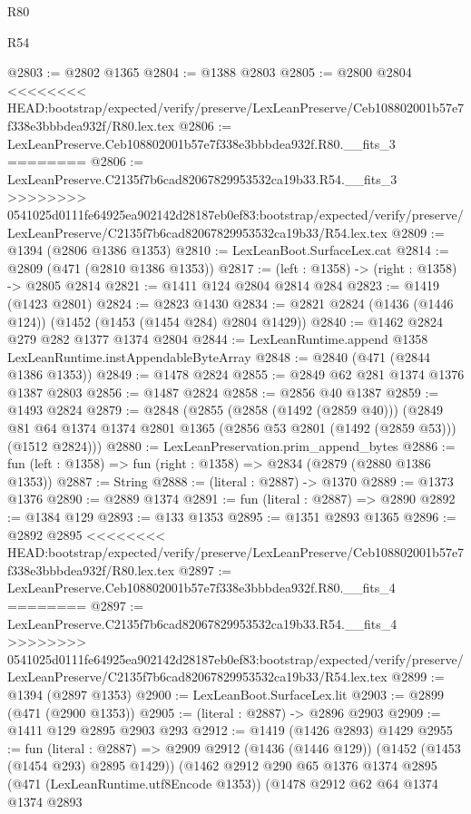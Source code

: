 \begin{lexlean}{R80}
\begin{lexlean}{R54}
\begin{coremodule}
{{{{{{{{{{{{{{{{{{{{{{{{{{{{{{{{{{{{{{{{{{{{{{{{{{@2803 := @2802 @1365
@2804 := @1388 @2803
@2805 := @2800 @2804
<<<<<<<< HEAD:bootstrap/expected/verify/preserve/LexLeanPreserve/Ceb108802001b57e7f338e3bbbdea932f/R80.lex.tex
@2806 := LexLeanPreserve.Ceb108802001b57e7f338e3bbbdea932f.R80.__fits_3
========
@2806 := LexLeanPreserve.C2135f7b6cad82067829953532ca19b33.R54.__fits_3
>>>>>>>> 0541025d0111fe64925ea902142d28187eb0ef83:bootstrap/expected/verify/preserve/LexLeanPreserve/C2135f7b6cad82067829953532ca19b33/R54.lex.tex
@2809 := @1394 (@2806 @1386 @1353)
@2810 := LexLeanBoot.SurfaceLex.cat
@2814 := @2809 (@471 (@2810 @1386 @1353))
@2817 := (left : @1358) -> (right : @1358) -> @2805 @2814
@2821 := @1411 @124 @2804 @2814 @284
@2823 := @1419 (@1423 @2801)
@2824 := @2823 @1430
@2834 := @2821 @2824 (@1436 (@1446 @124)) (@1452 (@1453 (@1454 @284) @2804 @1429))
@2840 := @1462 @2824 @279 @282 @1377 @1374 @2804
@2844 := LexLeanRuntime.append @1358 LexLeanRuntime.instAppendableByteArray
@2848 := @2840 (@471 (@2844 @1386 @1353))
@2849 := @1478 @2824
@2855 := @2849 @62 @281 @1374 @1376 @1387 @2803
@2856 := @1487 @2824
@2858 := @2856 @40 @1387
@2859 := @1493 @2824
@2879 := @2848
    (@2855
      (@2858 (@1492 (@2859 @40)))
      (@2849 @81 @64 @1374 @1374 @2801 @1365 (@2856 @53 @2801 (@1492 (@2859 @53))) (@1512 @2824)))
@2880 := LexLeanPreservation.prim_append_bytes
@2886 := fun (left : @1358) => fun (right : @1358) => @2834 (@2879 (@2880 @1386 @1353))
@2887 := String
@2888 := (literal : @2887) -> @1370
@2889 := @1373 @1376
@2890 := @2889 @1374
@2891 := fun (literal : @2887) => @2890
@2892 := @1384 @129
@2893 := @133 @1353
@2895 := @1351 @2893 @1365
@2896 := @2892 @2895
<<<<<<<< HEAD:bootstrap/expected/verify/preserve/LexLeanPreserve/Ceb108802001b57e7f338e3bbbdea932f/R80.lex.tex
@2897 := LexLeanPreserve.Ceb108802001b57e7f338e3bbbdea932f.R80.__fits_4
========
@2897 := LexLeanPreserve.C2135f7b6cad82067829953532ca19b33.R54.__fits_4
>>>>>>>> 0541025d0111fe64925ea902142d28187eb0ef83:bootstrap/expected/verify/preserve/LexLeanPreserve/C2135f7b6cad82067829953532ca19b33/R54.lex.tex
@2899 := @1394 (@2897 @1353)
@2900 := LexLeanBoot.SurfaceLex.lit
@2903 := @2899 (@471 (@2900 @1353))
@2905 := (literal : @2887) -> @2896 @2903
@2909 := @1411 @129 @2895 @2903 @293
@2912 := @1419 (@1426 @2893) @1429
@2955 := fun (literal : @2887) =>
  @2909
    @2912
    (@1436 (@1446 @129))
    (@1452 (@1453 (@1454 @293) @2895 @1429))
    (@1462
      @2912
      @290
      @65
      @1376
      @1374
      @2895
      (@471 (LexLeanRuntime.utf8Encode @1353))
      (@1478
        @2912
        @62
        @64
        @1374
        @1374
        @2893
}}}}}}}}}}}}}}}}}}}}}}}}}}}}}}}}}}}}}}}}}}}}}}}}}}
\end{coremodule}
\end{lexlean}
\end{lexlean}
